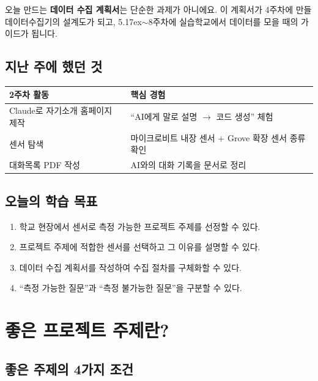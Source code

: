 \documentclass[11pt, a4paper]{article}
\newcommand{\tld}{\raise.17ex\hbox{$\scriptstyle\sim$}}
\begin{document}
오늘 만드는 \textbf{데이터 수집 계획서}는 단순한 과제가 아니에요. 이 계획서가 4주차에 만들 데이터수집기의 설계도가 되고, 5{\tld}8주차에 실습학교에서 데이터를 모을 때의 가이드가 됩니다.

\subsection{지난 주에 했던 것}

\begin{center}
\begin{tabularx}{0.92\textwidth}{L{5.5cm}X}
\toprule
\textbf{2주차 활동} & \textbf{핵심 경험} \\
\midrule
Claude로 자기소개 홈페이지 제작 & ``AI에게 말로 설명 $\rightarrow$ 코드 생성'' 체험 \\
센서 탐색 & 마이크로비트 내장 센서 + Grove 확장 센서 종류 확인 \\
대화목록 PDF 작성 & AI와의 대화 기록을 문서로 정리 \\
\bottomrule
\end{tabularx}
\end{center}

\subsection{오늘의 학습 목표}

\begin{bluebox}[학습 목표]
\begin{enumerate}[leftmargin=*, nosep]
  \item 학교 현장에서 센서로 측정 가능한 프로젝트 주제를 선정할 수 있다.
  \item 프로젝트 주제에 적합한 센서를 선택하고 그 이유를 설명할 수 있다.
  \item 데이터 수집 계획서를 작성하여 수집 절차를 구체화할 수 있다.
  \item ``측정 가능한 질문''과 ``측정 불가능한 질문''을 구분할 수 있다.
\end{enumerate}
\end{bluebox}

\section{좋은 프로젝트 주제란?}

\subsection{좋은 주제의 4가지 조건}
\end{document}
